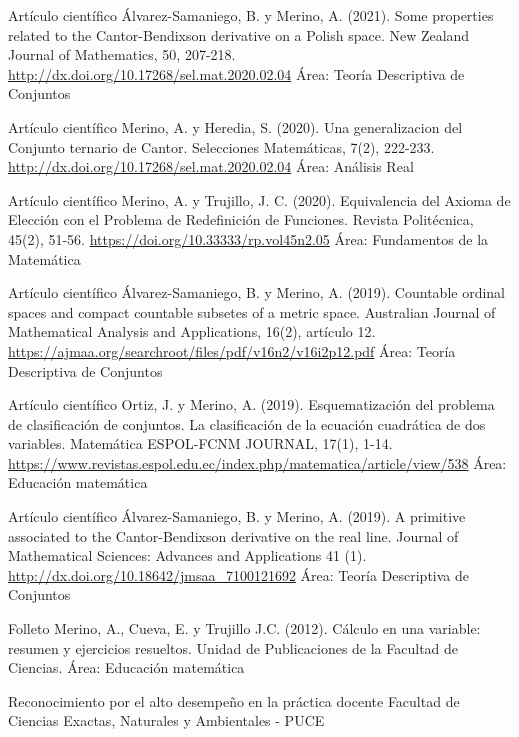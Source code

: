 \documentclass[
    a4paper,
    maincolor=cvblue!70!blue,
    sidecolor=gray!30,
    sectioncolor=cvblue!70!blue,
    sidebarwidth=7.5cm,
    topbottommargin=20pt,
    leftrightmargin=20pt,
]{fortysecondscv}
\begin{document}
    {Artículo científico}
    {Álvarez-Samaniego, B. y Merino, A. (2021). Some properties related to the Cantor-Bendixson derivative on a Polish space. New Zealand Journal of Mathematics, 50, 207-218.}     {\url{http://dx.doi.org/10.17268/sel.mat.2020.02.04}}
    {Área: Teoría Descriptiva de Conjuntos}
    
    {Artículo científico}
    {Merino, A. y Heredia, S. (2020). Una generalizacion del Conjunto ternario de Cantor. Selecciones Matemáticas, 7(2), 222-233.}     {\url{http://dx.doi.org/10.17268/sel.mat.2020.02.04}}
    {Área: Análisis Real}
    
    {Artículo científico}
    {Merino, A. y Trujillo, J. C. (2020). Equivalencia del Axioma de Elección con el Problema de Redefinición de Funciones. Revista Politécnica, 45(2), 51-56.}     {\url{https://doi.org/10.33333/rp.vol45n2.05}}
    {Área: Fundamentos de la Matemática}
    
    {Artículo científico}
    {Álvarez-Samaniego, B. y Merino, A. (2019). Countable ordinal spaces and compact countable subsetes of a metric space. Australian Journal of Mathematical Analysis and Applications, 16(2), artículo 12.}
    {\url{https://ajmaa.org/searchroot/files/pdf/v16n2/v16i2p12.pdf}}
    {Área: Teoría Descriptiva de Conjuntos}
    
    {Artículo científico}
    {Ortiz, J. y Merino, A. (2019). Esquematización del problema de clasificación de conjuntos. La clasificación de la ecuación cuadrática de dos variables. Matemática ESPOL-FCNM JOURNAL, 17(1), 1-14.}
    {\url{https://www.revistas.espol.edu.ec/index.php/matematica/article/view/538}}
    {Área: Educación matemática}
    
    {Artículo científico}
    {Álvarez-Samaniego, B. y Merino, A. (2019). A primitive associated to the Cantor-Bendixson derivative on the real line. Journal of Mathematical Sciences: Advances and Applications 41 (1).}     
    {\url{http://dx.doi.org/10.18642/jmsaa_7100121692}}
    {Área: Teoría Descriptiva de Conjuntos}
    
    {Folleto}
    {Merino, A., Cueva, E. y Trujillo J.C. (2012). Cálculo en una variable: resumen y ejercicios resueltos. Unidad de Publicaciones de la Facultad de Ciencias.}
    {}
    {Área: Educación matemática}
    


    {Reconocimiento por el alto desempeño en la práctica docente}
    {Facultad de Ciencias Exactas, Naturales y Ambientales - PUCE}
    {}
\end{document}
